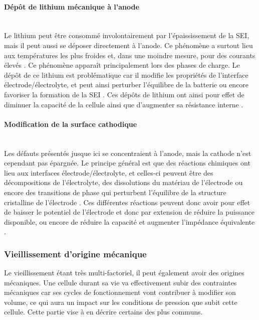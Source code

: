 \paragraph{Dépôt de lithium mécanique à l'anode}\hfill \\
Le lithium peut être consommé involontairement par l'épaississement de la SEI, mais il peut aussi se déposer directement à l'anode. Ce phénomène a surtout lieu aux températures les plus froides et, dans une moindre mesure, pour des courants élevés \cite{lin_low-temperature_2001}. Ce phénomène apparaît principalement lors des phases de charge. Le dépôt de ce lithium est problématique car il modifie les propriétés de l'interface électrode/électrolyte, et peut ainsi perturber l'équilibre de la batterie ou encore favoriser la formation de la SEI \cite{fleischhammer_interaction_2015}. Ces dépôts de lithium ont ainsi pour effet de diminuer la capacité de la cellule ainsi que d'augmenter sa résistance interne \cite{petzl_lithium_2015}. 

\paragraph{Modification de la surface cathodique}\hfill \\
Les défauts présentés jusque ici se concentraient à l'anode, mais la cathode n'est cependant pas épargnée. Le principe général est que des réactions chimiques ont lieu aux interfaces électrode/électrolyte, et celles-ci peuvent être des décompositions de l'électrolyte, des dissolutions du matériau de l'électrode ou encore des transitions de phase qui perturbent l'équilibre de la structure cristalline de l'électrode \cite{vetter_ageing_2005}. Ces différentes réactions peuvent donc avoir pour effet de baisser le potentiel de l'électrode et donc par extension de réduire la puissance disponible, ou encore de réduire la capacité et augmenter l'impédance équivalente \cite{bettge_voltage_2013}\cite{vetter_ageing_2005}.

\subsubsection{Vieillissement d'origine mécanique}
Le vieillissement étant très multi-factoriel, il peut également avoir des origines mécaniques. Une cellule durant sa vie va effectivement subir des contraintes mécaniques car ses cycles de fonctionnement vont contribuer à modifier son volume, ce qui aura un impact sur les conditions de pression que subit cette cellule. Cette partie vise à en décrire certains des plus communs.
